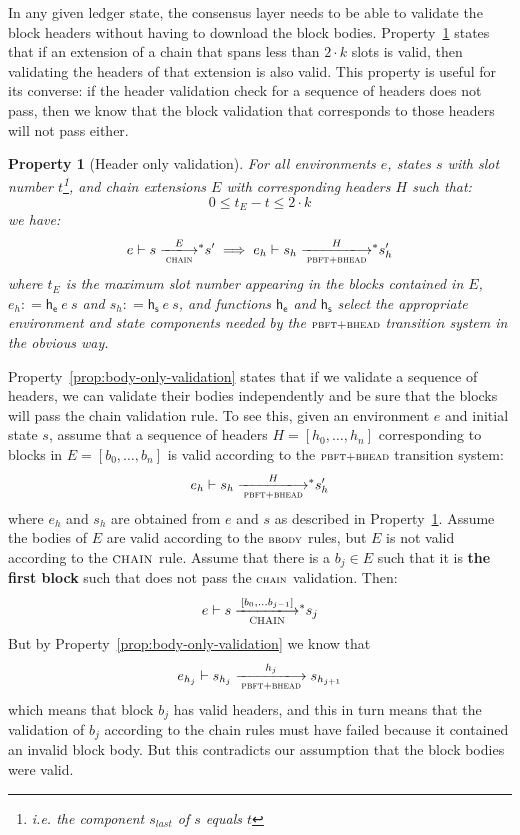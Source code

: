 \documentclass[11pt,a4paper]{article}
\newcommand{\var}[1]{\mathit{#1}}
\newcommand{\fun}[1]{\mathsf{#1}}
\newcommand{\trans}[2]{\xlongrightarrow[\textsc{#1}]{#2}}
\newcommand{\stslabel}[1]{\footnotesize{\textsc{#1}}}
\newcommand{\leteq}{\ensuremath{\mathrel{\mathop:}=}}
\newcommand{\transtar}[2]{\xlongrightarrow[\textsc{#1}]{#2}\negthickspace^{*}}
\newtheorem{property}{Property}
\begin{document}
In any given ledger state, the consensus layer needs to be able to validate the
block headers without having to download the block bodies.
Property~\ref{prop:header-only-validation} states that if an extension of a
chain that spans less than $2 \cdot k$ slots is valid, then validating the
headers of that extension is also valid. This property is useful for its
converse: if the header validation check for a sequence of headers does not
pass, then we know that the block validation that corresponds to those headers
will not pass either.

\begin{property}[Header only validation]\label{prop:header-only-validation}
  For all environments $e$, states $s$ with slot number $t$\footnote{i.e. the
    component $\var{s_{last}}$ of $s$ equals $t$}, and chain extensions $E$
  with corresponding headers $H$ such that:
  $$
  0 \leq t_E - t  \leq 2 \cdot k
  $$
  we have:
  $$
  e \vdash s \transtar{chain}{E} s' \implies e_h \vdash s_h \transtar{pbft+bhead}{H} s'_h
  $$
  where $t_E$ is the maximum slot number appearing in the blocks contained in
  $E$, $e_h \leteq \fun{h_e}~e~s$ and $s_h \leteq \fun{h_s}~e~s$, and functions $\fun{h_e}$
  and $\fun{h_s}$ select the appropriate environment and state components
  needed by the $\stslabel{pbft+bhead}$ transition system in the obvious way.
\end{property}

Property~\ref{prop:body-only-validation} states that if we validate a sequence
of headers, we can validate their bodies independently and be sure that the
blocks will pass the chain validation rule. To see this, given an environment
$e$ and initial state $s$, assume that a sequence of headers
$H = [h_0, \ldots, h_n]$ corresponding to blocks in $E = [b_0, \ldots, b_n]$ is
valid according to the $\stslabel{pbft+bhead}$ transition system:
%
$$
e_h \vdash s_h \transtar{pbft+bhead}{H} s'_h
$$
%
where $e_h$ and $s_h$ are obtained from $e$ and $s$ as described in
Property~\ref{prop:header-only-validation}. Assume the bodies of $E$ are valid
according to the $\stslabel{bbody}$ rules, but $E$ is not valid according to
the $\stslabel{CHAIN}$ rule. Assume that there is a $b_j \in E$ such that it is
\textbf{the first block} such that does not pass the $\stslabel{chain}$
validation. Then:
%
$$
e \vdash s \transtar{CHAIN}{[b_0, \ldots b_{j-1}]} s_j
$$
But by Property~\ref{prop:body-only-validation} we know that
%
$$
e_{h_j} \vdash s_{h_j} \trans{pbft+bhead}{h_j} s_{h_{j+1}}
$$
which means that block $b_j$ has valid headers, and this in turn means that the
validation of $b_j$ according to the chain rules must have failed because it
contained an invalid block body. But this contradicts our assumption that the
block bodies were valid.
\end{document}
